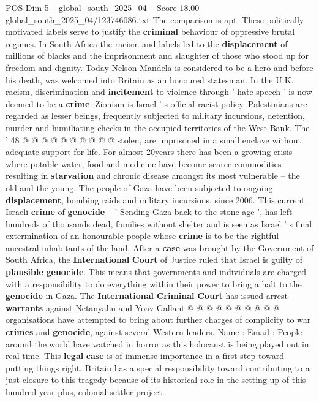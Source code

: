 \begin{textsample}{POS Dim 5 – global\_south\_2025\_04 – Score 18.00 – global\_south\_2025\_04/123746086.txt}
The comparison is apt.
These politically motivated labels serve to justify the \textbf{criminal} behaviour of oppressive brutal regimes.
In South Africa the racism and labels led to the \textbf{displacement} of millions of blacks and the imprisonment and slaughter of those who stood up for freedom and dignity.
Today Nelson Mandela is considered to be a hero and before his death, was welcomed into Britain as an honoured statesman.
In the U.K. racism, discrimination and \textbf{incitement} to violence through ' hate speech ' is now deemed to be a \textbf{crime}.
Zionism is Israel ' s official racist policy.
Palestinians are regarded as lesser beings, frequently subjected to military incursions, detention, murder and humiliating checks in the occupied territories of the West Bank.
The ' 48 @ @ @ @ @ @ @ @ @ @ stolen, are imprisoned in a small enclave without adequate support for life.
For almost 20years there has been a growing crisis where potable water, food and medicine have become scarce commodities resulting in \textbf{starvation} and chronic disease amongst its most vulnerable -- the old and the young.
The people of Gaza have been subjected to ongoing \textbf{displacement}, bombing raids and military incursions, since 2006.
This current Israeli \textbf{crime} of \textbf{genocide} -- ' Sending Gaza back to the stone age ', has left hundreds of thousands dead, families without shelter and is seen as Israel ' s final extermination of an honourable people whose \textbf{crime} is to be the rightful ancestral inhabitants of the land.
After a \textbf{case} was brought by the Government of South Africa, the \textbf{International} \textbf{Court} of Justice ruled that Israel is guilty of \textbf{plausible} \textbf{genocide}.
This means that governments and individuals are charged with a responsibility to do everything within their power to bring a halt to the \textbf{genocide} in Gaza.
The \textbf{International} \textbf{Criminal} \textbf{Court} has issued arrest \textbf{warrants} against Netanyahu and Yoav Gallant @ @ @ @ @ @ @ @ @ @ organisations have attempted to bring about further charges of complicity to war \textbf{crimes} and \textbf{genocide}, against several Western leaders.
Name : Email : People around the world have watched in horror as this holocaust is being played out in real time.
This \textbf{legal} \textbf{case} is of immense importance in a first step toward putting things right.
Britain has a special responsibility toward contributing to a just closure to this tragedy because of its historical role in the setting up of this hundred year plus, colonial settler project.

\end{textsample}
